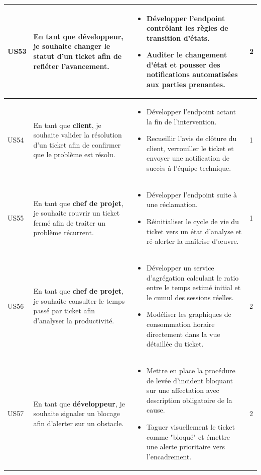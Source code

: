 \begin{longtable}{|C{1cm}|L{5.6cm}|L{8cm}|C{0.85cm}|}
US53 & En tant que \textbf{développeur}, je souhaite changer le statut d'un ticket afin de refléter l'avancement. &
\begin{itemize}[nosep, left=0pt, label={$\bullet$}]
\item Développer l'endpoint contrôlant les règles de transition d'états.
\item Auditer le changement d'état et pousser des notifications automatisées aux parties prenantes.
\end{itemize} & 2 \\
\hline

US54 & En tant que \textbf{client}, je souhaite valider la résolution d'un ticket afin de confirmer que le problème est résolu. &
\begin{itemize}[nosep, left=0pt, label={$\bullet$}]
\item Développer l'endpoint actant la fin de l'intervention.
\item Recueillir l'avis de clôture du client, verrouiller le ticket et envoyer une notification de succès à l'équipe technique.
\end{itemize} & 1 \\
\hline

US55 & En tant que \textbf{chef de projet}, je souhaite rouvrir un ticket fermé afin de traiter un problème récurrent. &
\begin{itemize}[nosep, left=0pt, label={$\bullet$}]
\item Développer l'endpoint suite à une réclamation.
\item Réinitialiser le cycle de vie du ticket vers un état d'analyse et ré-alerter la maîtrise d'œuvre.
\end{itemize} & 1 \\
\hline

US56 & En tant que \textbf{chef de projet}, je souhaite consulter le temps passé par ticket afin d'analyser la productivité. &
\begin{itemize}[nosep, left=0pt, label={$\bullet$}]
\item Développer un service d'agrégation calculant le ratio entre le temps estimé initial et le cumul des sessions réelles.
\item Modéliser les graphiques de consommation horaire directement dans la vue détaillée du ticket.
\end{itemize} & 2 \\
\hline

US57 & En tant que \textbf{développeur}, je souhaite signaler un blocage afin d'alerter sur un obstacle. &
\begin{itemize}[nosep, left=0pt, label={$\bullet$}]
\item Mettre en place la procédure de levée d'incident bloquant sur une affectation avec description obligatoire de la cause.
\item Taguer visuellement le ticket comme "bloqué" et émettre une alerte prioritaire vers l'encadrement.
\end{itemize} & 2 \\
\hline


\end{longtable}
